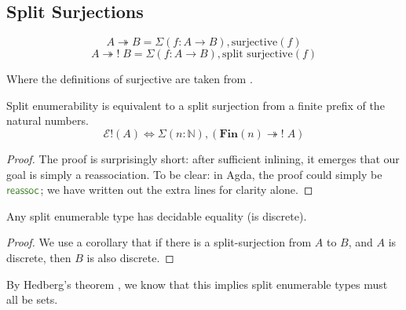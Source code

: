 \subsection{Split Surjections}
\begin{rm-definition}[Surjections]
  \begin{multicols}{2}
    \begin{equation}
      A \twoheadrightarrow B = \Sigma (f : A \rightarrow B) , \text{surjective}(f)
    \end{equation} \break
    \begin{equation}
      A \twoheadrightarrow! \; B = \Sigma (f : A \rightarrow B) , \text{split surjective}(f)
    \end{equation}
  \end{multicols}
  Where the definitions of surjective are taken from \cite[definition
  4.6.1]{hottbook}.
\end{rm-definition}
\begin{rm-theorem} \label{split-enum-surj}
  Split enumerability is equivalent to a split surjection from a finite prefix
  of the natural numbers.
  \begin{equation}
    \mathcal{E}!(A) \iff \Sigma {(n : \mathbb{N})} , \left( \mathbf{Fin}(n) \twoheadrightarrow ! \; A \right)
  \end{equation}
\end{rm-theorem}
\begin{proof}
  The proof is surprisingly short: after sufficient inlining, it emerges that
  our goal is simply a reassociation.
  To be clear: in Agda, the proof could simply be \(\AgdaFunction{reassoc}\); we
  have written out the extra lines for clarity alone.
\end{proof}

\begin{rm-lemma} \label{split-enum-discrete}
  Any split enumerable type has decidable equality (is discrete).
\end{rm-lemma}
\begin{proof}
  We use a corollary that if there is a split-surjection from \(A\) to \(B\),
  and \(A\) is discrete, then \(B\) is also discrete.
\end{proof}
By Hedberg's theorem \cite{hedbergCoherenceTheoremMartinLof1998}, we know that
this implies split enumerable types must all be sets.
